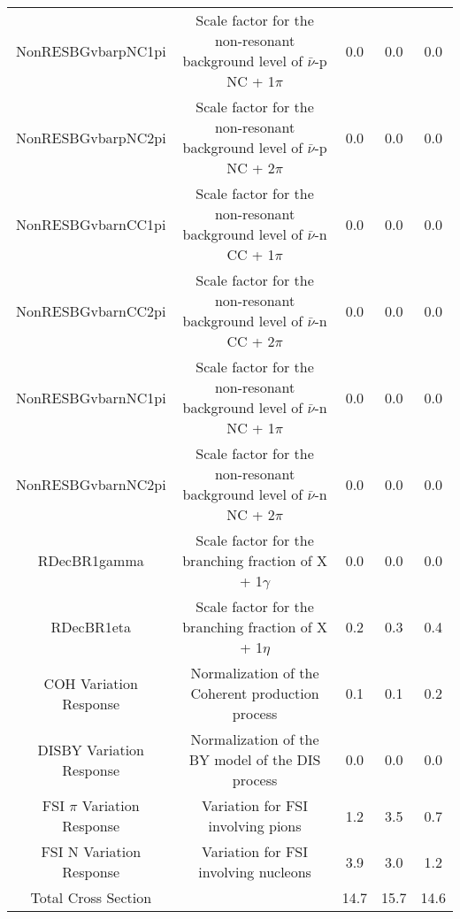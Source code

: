 \begin{tabular}{ccccc}
NonRESBGvbarpNC1pi & Scale factor for the non-resonant background level of $\bar{\nu}$-p NC + 1$\pi$ & 0.0 & 0.0 & 0.0 \\
NonRESBGvbarpNC2pi & Scale factor for the non-resonant background level of $\bar{\nu}$-p NC + 2$\pi$ & 0.0 & 0.0 & 0.0 \\
NonRESBGvbarnCC1pi & Scale factor for the non-resonant background level of $\bar{\nu}$-n CC + 1$\pi$ & 0.0 & 0.0 & 0.0 \\
NonRESBGvbarnCC2pi & Scale factor for the non-resonant background level of $\bar{\nu}$-n CC + 2$\pi$ & 0.0 & 0.0 & 0.0 \\
NonRESBGvbarnNC1pi & Scale factor for the non-resonant background level of $\bar{\nu}$-n NC + 1$\pi$ & 0.0 & 0.0 & 0.0 \\
NonRESBGvbarnNC2pi & Scale factor for the non-resonant background level of $\bar{\nu}$-n NC + 2$\pi$ & 0.0 & 0.0 & 0.0 \\
RDecBR1gamma & Scale factor for the branching fraction of X + 1$\gamma$ & 0.0 & 0.0 & 0.0 \\
RDecBR1eta & Scale factor for the branching fraction of X + 1$\eta$ & 0.2 & 0.3 & 0.4 \\
COH Variation Response & Normalization of the Coherent production process & 0.1 & 0.1 & 0.2 \\
DISBY Variation Response & Normalization of the BY model of the DIS process & 0.0 & 0.0 & 0.0 \\
FSI $\pi$ Variation Response & Variation for FSI involving pions & 1.2 & 3.5 & 0.7 \\
FSI N Variation Response & Variation for FSI involving nucleons & 3.9 & 3.0 & 1.2 \\
\midrule
Total Cross Section &  & 14.7 & 15.7 & 14.6 \\
\bottomrule
\end{tabular}